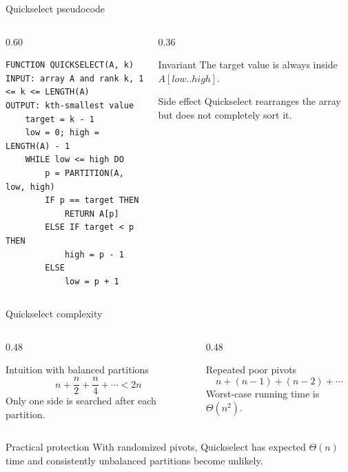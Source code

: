 \documentclass[aspectratio=169]{beamer}
\begin{document}
\begin{frame}[fragile]{Quickselect pseudocode}
  \begin{columns}[T]
    \begin{column}{0.60\textwidth}
\begin{lstlisting}[style=pseudonumbered]
FUNCTION QUICKSELECT(A, k)
INPUT: array A and rank k, 1 <= k <= LENGTH(A)
OUTPUT: kth-smallest value
    target = k - 1
    low = 0; high = LENGTH(A) - 1
    WHILE low <= high DO
        p = PARTITION(A, low, high)
        IF p == target THEN
            RETURN A[p]
        ELSE IF target < p THEN
            high = p - 1
        ELSE
            low = p + 1
\end{lstlisting}
    \end{column}
    \begin{column}{0.36\textwidth}
      \begin{block}{Invariant}
        The target value is always inside $A[low..high]$.
      \end{block}
      \begin{alertblock}{Side effect}
        Quickselect rearranges the array but does not completely sort it.
      \end{alertblock}
    \end{column}
  \end{columns}
\end{frame}

\begin{frame}{Quickselect complexity}
  \small
  \begin{columns}[T]
    \begin{column}{0.48\textwidth}
      \begin{exampleblock}{Intuition with balanced partitions}
        \[
          n+\frac n2+\frac n4+\cdots < 2n
        \]
        Only one side is searched after each partition.
      \end{exampleblock}
    \end{column}
    \begin{column}{0.48\textwidth}
      \begin{alertblock}{Repeated poor pivots}
        \[
          n+(n-1)+(n-2)+\cdots
        \]
        Worst-case running time is $\Theta(n^2)$.
      \end{alertblock}
    \end{column}
  \end{columns}
  \begin{block}{Practical protection}
    With randomized pivots, Quickselect has expected $\Theta(n)$ time and
    consistently unbalanced partitions become unlikely.
  \end{block}
\end{frame}
\end{document}
